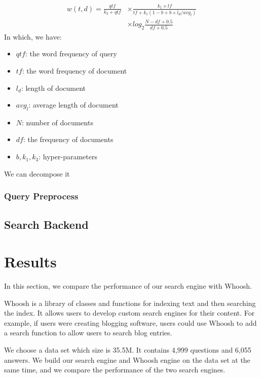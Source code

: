 \documentclass[10pt,journal,compsoc]{IEEEtran}
\begin{document}
\begin{equation*}
\begin{aligned}
w(t, d) = \frac{qtf}{k_3 + qtf} &\times \frac{k_1\times tf}{tf+k_1(1-b+b\times l_d / avg_l)} \\ 
&\times log_2\frac{N-df+0.5}{df+0.5}
\end{aligned}
\end{equation*}
In which, we have:
\begin{itemize}
    \item $qtf$: the word frequency of query
    \item $tf$: the word frequency of document
    \item $l_d$: length of document
    \item $avg_l$: average length of document
    \item $N$: number of documents
    \item $df$: the frequency of documents
    \item $b, k_1, k_3$: hyper-parameters
\end{itemize}

We can decompose it

\subsubsection{Query Preprocess}


\subsection{Search Backend}
\label{subsec:search_backend}

\section{Results}
\label{sec:results}
In this section, we compare the performance of our search engine with Whoosh.

Whoosh is a library of classes and functions for indexing text and then searching the index. It allows users to develop custom search engines for their content. For example, if users were creating blogging software, users could use Whoosh to add a search function to allow users to search blog entries.

We choose a data set which size is 35.5M. It contains 4,999 questions and 6,055 answers. We build our search engine and Whoosh engine on the data set at the same time, and we compare the performance of the two search engines. 
\end{document}
